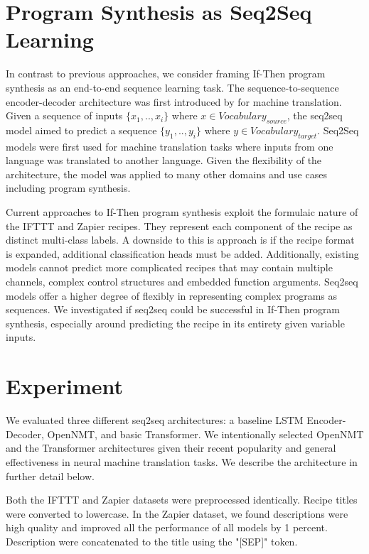 \documentclass[letterpaper]{article} %
\begin{document}
\section{Program Synthesis as Seq2Seq Learning}
In contrast to previous approaches, we consider framing If-Then program synthesis as an end-to-end sequence learning task. The sequence-to-sequence encoder-decoder architecture was first introduced by \citeauthor{DBLP:journals/corr/SutskeverVL14} \citeyear{DBLP:journals/corr/SutskeverVL14} for machine translation. Given a sequence of inputs $\{x_1, .., x_i\}$ where $x \in Vocabulary_{source}$, the seq2seq model aimed to predict a sequence $\{y_1, .., y_i\}$ where $y \in Vocabulary_{target}$. Seq2Seq models were first used for machine translation tasks where inputs from one language was translated to another language. Given the flexibility of the architecture, the model was applied to many other domains and use cases including program synthesis.

Current approaches to If-Then program synthesis exploit the formulaic nature of the IFTTT and Zapier recipes. They represent each component of the recipe as distinct multi-class labels. A downside to this is approach is if the recipe format is expanded, additional classification heads must be added. Additionally, existing models cannot predict more complicated recipes that may contain multiple channels, complex control structures and embedded function arguments. Seq2seq models offer a higher degree of flexibly in representing complex programs as sequences. We investigated if seq2seq could be successful in If-Then program synthesis, especially around predicting the recipe in its entirety given variable inputs.


\section{Experiment}
We evaluated three different seq2seq architectures: a baseline LSTM Encoder-Decoder, OpenNMT, and basic Transformer. We intentionally selected OpenNMT and the Transformer architectures given their recent popularity and general effectiveness in neural machine translation tasks. We describe the architecture in further detail below.

Both the IFTTT and Zapier datasets were preprocessed identically. Recipe titles were converted to lowercase. In the Zapier dataset, we found descriptions were high quality and improved all the performance of all models by 1 percent. Description were concatenated to the title using the "[SEP]" token.
\end{document}
